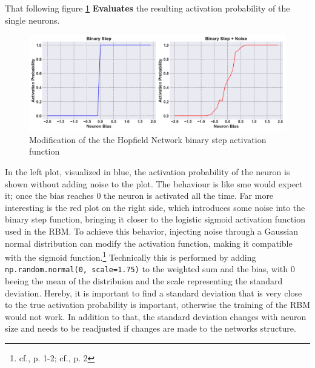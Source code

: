 That following figure \ref{Noisy_acitivation_function_bad} \textbf{Evaluates} the resulting activation probability of the single neurons. 
\begin{figure}[H]
    \centering
    \includegraphics[width=1\linewidth]{graphics/combined_noise_activation_plots.png}
    \caption{Modification of the the Hopfield Network binary step activation function}
    \label{Noisy_acitivation_function_bad}
\end{figure}
In the left plot, visualized in blue, the activation probability of the neuron is shown without adding noise to the plot. 
The behaviour is like sme would expect it; once the bias reaches 0 the neuron is activated all the time.
Far more interesting is the red plot on the right side, which introduces some noise into the binary step function, bringing it closer to the logistic sigmoid activation function used in the \ac{RBM}.
To achieve this behavior, injecting noise through a Gaussian normal distribution can modify the activation function, making it compatible with the sigmoid function.\footnote{cf.\cite{bohmNoiseinjectedAnalogIsing2022}, p. 1-2; cf.\cite{mahmoodiVersatileStochasticDot2019}, p. 2}
Technically this is performed by adding \texttt{np.random.normal(0, scale=1.75)} to the weighted sum and the bias, with 0 beeing the mean of the distribuion and the scale representing the standard deviation. 
Hereby, it is important to find a standard deviation that is very close to the true activation probability is important, otherwise the training of the RBM would not work.
In addition to that, the standard deviation changes with neuron size and needs to be readjusted if changes are made to the networks structure.

